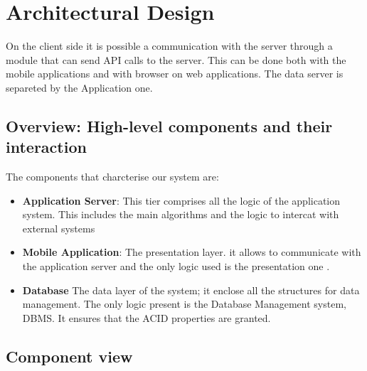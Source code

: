 \documentclass[a4paper]{article}
\begin{document}
\newpage

\section{Architectural Design}



On the client side it is possible a communication with the server through a module that can send API calls to the server. This can be done both with the mobile applications and with browser on web applications.
The data server is separeted by the Application one.




\subsection{Overview: High-level components and their interaction}

The components that charcterise our system are:

\begin{itemize}
    \item \textbf{Application Server}: This tier comprises all the logic of the application system. This includes the main algorithms and the logic to intercat with external systems
    
    \item \textbf{Mobile Application}: The presentation layer.
it allows to communicate with the application server and the only logic used is the presentation one .

   \item \textbf{Database} The data layer of the system; it enclose all the structures for data management. The only logic present is the Database Management system, DBMS. It ensures that the ACID properties are granted.
\end{itemize}


\newpage

\subsection{Component view}
\end{document}
